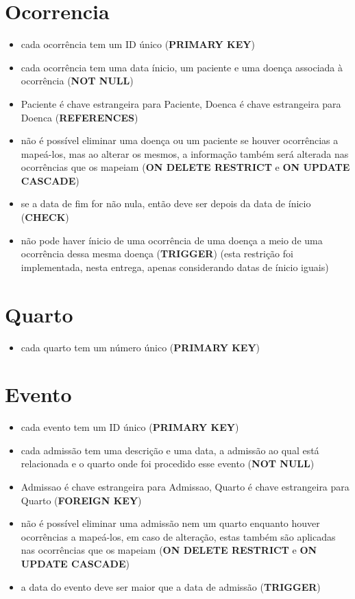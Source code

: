 \documentclass[article, a4paper, 12pt, oneside]{memoir}
\begin{document}
\section*{Ocorrencia}
\begin{itemize}
	\item cada ocorrência tem um ID único (\textbf{PRIMARY KEY})
	\item cada ocorrência tem uma data ínicio, um paciente e uma doença associada à ocorrência (\textbf{NOT NULL})
	\item Paciente é chave estrangeira para Paciente, Doenca é chave estrangeira para Doenca (\textbf{REFERENCES})
	\item não é possível eliminar uma doença ou um paciente se houver ocorrências a mapeá-los, mas ao alterar os mesmos, a informação também será alterada nas ocorrências que os mapeiam (\textbf{ON DELETE RESTRICT} e \textbf{ON UPDATE CASCADE})
	\item se a data de fim for não nula, então deve ser depois da data de ínicio (\textbf{CHECK})
	\item não pode haver ínicio de uma ocorrência de uma doença a meio de uma ocorrência dessa mesma doença (\textbf{TRIGGER}) (esta restrição foi implementada, nesta entrega, apenas considerando datas de ínicio iguais)
\end{itemize}

\section*{Quarto}
\begin{itemize}
	\item cada quarto tem um número único (\textbf{PRIMARY KEY})
\end{itemize}

\section*{Evento}
\begin{itemize}
	\item cada evento tem um ID único (\textbf{PRIMARY KEY})
	\item cada admissão tem uma descrição e uma data, a admissão ao qual está relacionada e o quarto onde foi procedido esse evento (\textbf{NOT NULL})
	\item Admissao é chave estrangeira para Admissao, Quarto é chave estrangeira para Quarto (\textbf{FOREIGN KEY})
	\item não é possível eliminar uma admissão nem um quarto enquanto houver ocorrências a mapeá-los, em caso de alteração, estas também são aplicadas nas ocorrências que os mapeiam (\textbf{ON DELETE RESTRICT} e \textbf{ON UPDATE CASCADE})
	\item a data do evento deve ser maior que a data de admissão (\textbf{TRIGGER})
\end{itemize}
\end{document}
